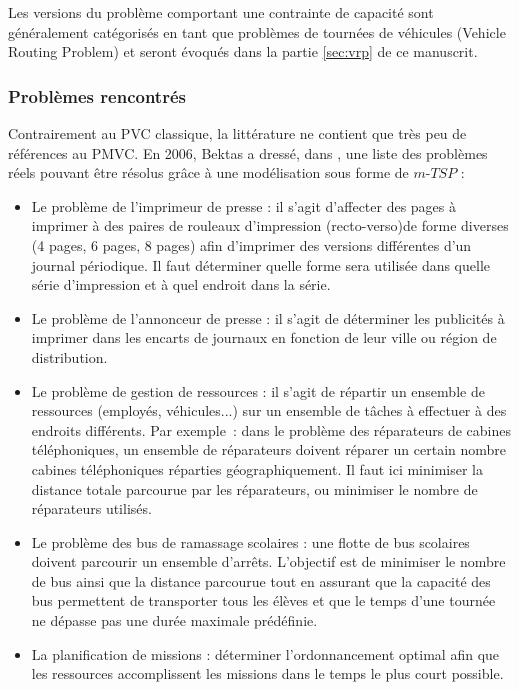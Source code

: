 Les versions du problème comportant une contrainte de capacité sont généralement catégorisés en tant que problèmes de tournées de véhicules (Vehicle Routing Problem) et seront évoqués dans la partie \ref{sec:vrp} de ce manuscrit.

\subsubsection{Problèmes rencontrés}
  Contrairement au PVC classique, la littérature ne contient que très peu de références au PMVC. En 2006, Bektas a dressé, dans \cite{Bektas2006}, une liste des problèmes réels pouvant être résolus grâce à une modélisation sous forme de $m$-$TSP$ : 
  \begin{itemize}
   \item Le problème de l'imprimeur de presse : il s'agit d'affecter des pages à imprimer à des paires de rouleaux d'impression (recto-verso)de forme diverses (4 pages, 6 pages, 8 pages) afin d'imprimer des versions différentes d'un journal périodique. Il faut déterminer quelle forme sera utilisée dans quelle série d'impression et à quel endroit dans la série.
   \item Le problème de l'annonceur de presse : il s'agit de déterminer les publicités à imprimer dans les encarts de journaux en fonction de leur ville ou région de distribution.
   \item Le problème de gestion de ressources : il s'agit de répartir un ensemble de ressources (employés, véhicules...) sur un ensemble de tâches à effectuer à des endroits différents. Par exemple~: dans le problème des réparateurs de cabines téléphoniques, un ensemble de réparateurs doivent réparer un certain nombre cabines téléphoniques réparties géographiquement. Il faut ici minimiser la distance totale parcourue par les réparateurs, ou minimiser le nombre de réparateurs utilisés.
   \item Le problème des bus de ramassage scolaires : une flotte de bus scolaires doivent parcourir un ensemble d'arrêts. L'objectif est de minimiser le nombre de bus ainsi que la distance parcourue tout en assurant que la capacité des bus permettent de transporter tous les élèves et que le temps d'une tournée ne dépasse pas une durée maximale prédéfinie.
   \item La planification de missions : déterminer l'ordonnancement optimal afin que les ressources accomplissent les missions dans le temps le plus court possible.
  \end{itemize}
  
